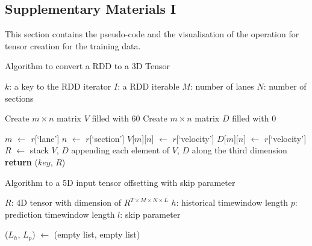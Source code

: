 \documentclass[11pt]{uonthesis}
\begin{document}



\begin{appendices}

\chapter{Supplementary Materials I}

This section contains the pseudo-code and the visualisation of the operation for tensor creation for the training data.

\begin{algorithm}
    \caption{Algorithm to convert a RDD to a 3D Tensor}
    \label{alg:rddto3d}
    \begin{algorithmic}[1]
    \State $k$: a key to the RDD iterator
    \State $I$: a RDD iterable
    \State $M$: number of lanes
    \State $N$: number of sections

        \State Create $m \times n$ matrix $V$ filled with 60 
        \State Create $m \times n$ matrix $D$ filled with 0
    
            \State $m$ $\gets$ $r$[`lane']
            \State $n$ $\gets$ $r$[`section']
            \State $V$[$m$][$n$] $\gets$ $r$[`velocity']
            \State $D$[$m$][$n$] $\gets$ $r$[`velocity']
        \EndFor
        \State $R$ $\gets$ stack $V$, $D$ appending each element of $V$, $D$ along the third dimension
        \State \textbf{return} ($key$, $R$)
        \EndProcedure
    \end{algorithmic}
\end{algorithm}

\begin{algorithm}
    \caption{Algorithm to a 5D input tensor offsetting with skip parameter}
    \label{alg:offset4d}
    \begin{algorithmic}[1]
    \State $R$: 4D tensor with dimension of $R^{T{\times}M{\times}N{\times}L}$
    \State $h$: historical timewindow length
    \State $p$: prediction timewindow length
    \State $l$: skip parameter

        \State ($L_h$, $L_p$) $\gets$ (empty list, empty list) 
    

\end{algorithmic}
\end{algorithm}
\end{appendices}
\end{document}
